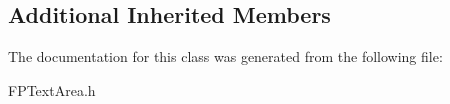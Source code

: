 \subsection*{Additional Inherited Members}


The documentation for this class was generated from the following file\+:\begin{DoxyCompactItemize}
\item 
F\+P\+Text\+Area.\+h\end{DoxyCompactItemize}
